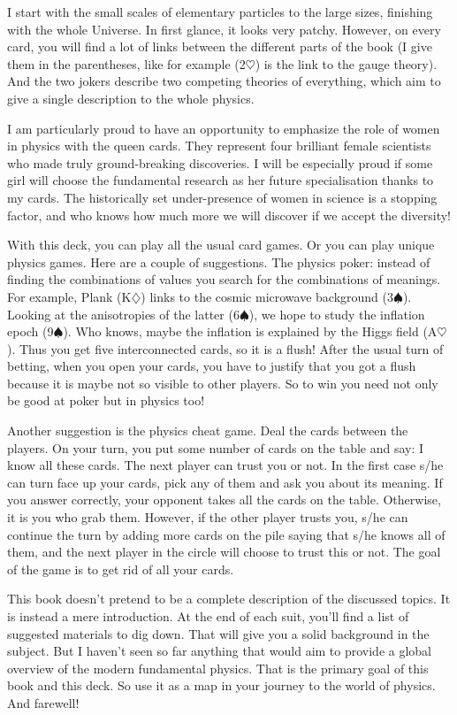 \documentclass[]{bookest}
\begin{document}
I start with the small scales of elementary particles to the large sizes, finishing with the whole Universe. In first glance, it looks very patchy. However, on every card, you will find a lot of links between the different parts of the book (I give them in the parentheses, like for example (2$\heartsuit$) is the link to the gauge theory). And the two jokers describe two competing theories of everything, which aim to give a single description to the whole physics.

I am particularly proud to have an opportunity to emphasize the role of women in physics with the queen cards. They represent four brilliant female scientists who made truly ground-breaking discoveries. I will be especially proud if some girl will choose the fundamental research as her future specialisation thanks to my cards. The historically set under-presence of women in science is a stopping factor, and who knows how much more we will discover if we accept the diversity!

With this deck, you can play all the usual card games. Or you can play unique physics games. Here are a couple of suggestions. The physics poker: instead of finding the combinations of values you search for the combinations of meanings. For example, Plank (K$\diamondsuit$) links to the cosmic microwave background (3$\spadesuit$). Looking at the anisotropies of the latter (6$\spadesuit$), we hope to study the inflation epoch (9$\spadesuit$). Who knows, maybe the inflation is explained by the Higgs field (A$\heartsuit$). Thus you get five interconnected cards, so it is a flush! After the usual turn of betting, when you open your cards, you have to justify that you got a flush because it is maybe not so visible to other players. So to win you need not only be good at poker but in physics too!

Another suggestion is the physics cheat game. Deal the cards between the players. On your turn, you put some number of cards on the table and say: I know all these cards. The next player can trust you or not. In the first case s/he can turn face up your cards, pick any of them and ask you about its meaning. If you answer correctly, your opponent takes all the cards on the table. Otherwise, it is you who grab them. However, if the other player trusts you, s/he can continue the turn by adding more cards on the pile saying that s/he knows all of them, and the next player in the circle will choose to trust this or not. The goal of the game is to get rid of all your cards.

This book doesn't pretend to be a complete description of the discussed topics. It is instead a mere introduction. At the end of each suit, you'll find a list of suggested materials to dig down. That will give you a solid background in the subject. But I haven't seen so far anything that would aim to provide a global overview of the modern fundamental physics. That is the primary goal of this book and this deck. So use it as a map in your journey to the world of physics. And farewell!

\newpage





\end{document}
